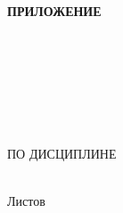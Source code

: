 \begin{ESKDtitlePage}
    \begin{flushright}
        \textbf{ПРИЛОЖЕНИЕ~\envCourseworkPrilLetter} \enspace\enspace
    \end{flushright}

    \begin{center}
        \envCourseworkEducation \\
        \envCourseworkUniversity \\
        \envCourseworkCathedra \\
    \end{center}

    \vfill

    \begin{center}
        \envCourseworkTitle \\
    \end{center}

    \vfill

    \begin{center}
        \textbf{\envCourseworkDocumentTitle} \\
        ПО ДИСЦИПЛИНЕ \envCourseworkSubject \\
    \end{center}

    \vfill

    \begin{center}
        \envCourseworkCode \\
        Листов \pageref{LastPage} \\
    \end{center}

    \vfill

    

    \vfill

    \begin{center}
        \ESKDtheYear
    \end{center}
\end{ESKDtitlePage}
